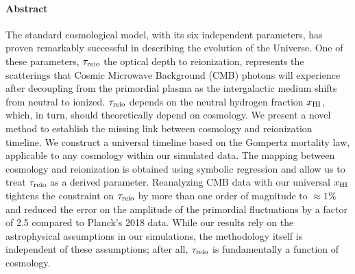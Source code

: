 

\paragraph{\large Abstract}

The standard cosmological model, with its six independent parameters,
has proven remarkably successful in describing the evolution of the
Universe.
One of these parameters, $\tau_{\mathrm{reio}}$ the optical depth to reionization,
represents the scatterings that Cosmic Microwave Background (CMB)
photons will experience after decoupling from the primordial plasma as
the intergalactic medium shifts from neutral to ionized.
$\tau_{\mathrm{reio}}$ depends on the neutral hydrogen fraction $x_{\mathrm{HI}}$, which, in
turn, should theoretically depend on cosmology.
We present a novel method to establish the missing link between
cosmology and reionization timeline.
We construct a universal timeline based on the Gompertz mortality law,
applicable to any cosmology within our simulated data.
The mapping between cosmology and reionization is obtained using
symbolic regression and allow us to treat $\tau_{\mathrm{reio}}$ as a derived
parameter.
Reanalyzing CMB data with our universal $x_{\mathrm{HI}}$ tightens the constraint
on $\tau_{\mathrm{reio}}$ by more than one order of magnitude to $\approx 1\%$ and
reduced the error on the amplitude of the primordial fluctuations by a
factor of 2.5 compared to Planck's 2018 data.
While our results rely on the astrophysical assumptions in our
simulations, the methodology itself is independent of these assumptions;
after all, $\tau_{\mathrm{reio}}$ is fundamentally a function of cosmology.
